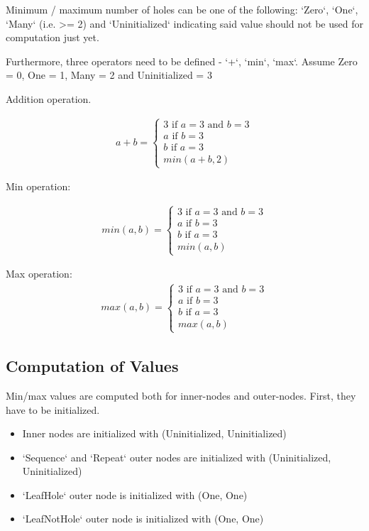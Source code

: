 Minimum / maximum number of holes can be one of the following: `Zero`, `One`, `Many` (i.e. >= 2) and `Uninitialized` indicating said value should not be used for computation just yet.

Furthermore, three operators need to be defined - `+`, `min`, `max`. Assume Zero = 0, One = 1, Many = 2 and Uninitialized = 3

Addition operation.

\begin{align}
	a + b =
	\begin{cases}
		3 \text{ if } a = 3 \text{ and } b = 3 \\
		a \text{ if } b = 3 \\
		b \text{ if } a = 3 \\
		min(a + b, 2)
	\end{cases}
\end{align}

Min operation:

\begin{align}
	min(a,b) =
	\begin{cases}
		3 \text{ if } a = 3 \text{ and } b = 3 \\
		a \text{ if } b = 3 \\
		b \text{ if } a = 3 \\
		min(a, b)
	\end{cases}
\end{align}

Max operation:
\begin{align}
	max(a, b) =
	\begin{cases}
		3 \text{ if } a = 3 \text{ and } b = 3 \\
		a \text{ if } b = 3 \\
		b \text{ if } a = 3 \\
		max(a, b)
	\end{cases}
\end{align}


\subsection{Computation of Values}
Min/max values are computed both for inner-nodes and outer-nodes. First, they have to be initialized.

\begin{itemize}
\item
Inner nodes are initialized with (Uninitialized, Uninitialized)
\item
`Sequence` and `Repeat` outer nodes are initialized with (Uninitialized, Uninitialized)
\item
`LeafHole` outer node is initialized with (One, One)
\item
`LeafNotHole` outer node is initialized with (One, One)
\end{itemize}


